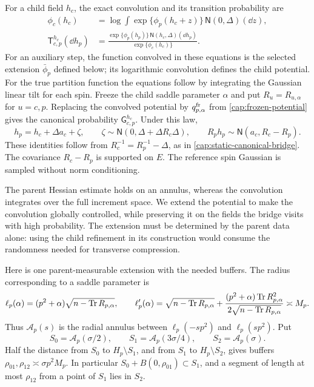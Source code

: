 For a child field \(h_c\), the exact convolution and its transition
probability are
\begin{align}
 \phi_c(h_c)&=\log\int \exp\{\phi_p(h_c+z)\}\,\mathsf N(0,\Delta)(\dd z),
 \label{cap:heat-convolution}\\
 \mathsf T_{c,p}^{h_c}(\dd h_p)
 &=\frac{\exp\{\phi_p(h_p)\}\,
       \mathsf N(h_c,\Delta)(\dd h_p)}{\exp\{\phi_c(h_c)\}}.
 \label{cap:actual-transition}
\end{align}
For an auxiliary step, the function convolved in these equations is the
selected extension \(\bar\phi_p\) defined below; its logarithmic convolution
defines the child potential. For the true partition function the equations
follow by integrating the Gaussian linear tilt for each spin. Freeze the child
saddle parameter \(\alpha\) and put \(R_u=R_{u,\alpha}\) for \(u=c,p\).
Replacing the convolved potential by \(q_{p,\alpha}^{\rm fr}\) from
\eqref{cap:frozen-potential} gives the canonical probability
\(\mathsf G_{c,p}^{h_c}\). Under this law,
\begin{equation}\label{cap:canonical-bridge}
 h_p=h_c+\Delta a_c+\zeta,\qquad
 \zeta\sim\mathsf N(0,\Delta+\Delta R_c\Delta),\qquad
 R_p h_p\sim\mathsf N(a_c,R_c-R_p).
\end{equation}
These identities follow from \(R_c^{-1}=R_p^{-1}-\Delta\), as in
\eqref{cap:static-canonical-bridge}. The covariance \(R_c-R_p\) is supported
on \(E\). The reference spin Gaussian is sampled without norm conditioning.

The parent Hessian estimate holds on an annulus, whereas the convolution
integrates over the full increment space. We extend the potential to make the
convolution globally controlled, while preserving it on the fields the bridge
visits with high probability. The extension must be determined by the parent
data alone: using the child refinement in its construction would consume the
randomness needed for transverse compression.

Here is one parent-measurable extension with the needed buffers. The radius
corresponding to a saddle parameter is
\[
 \ell_p(\alpha)=(p^2+\alpha)\sqrt{n-\operatorname{Tr} R_{p,\alpha}},\qquad
 \ell_p'(\alpha)=\sqrt{n-\operatorname{Tr} R_{p,\alpha}}+
 \frac{(p^2+\alpha)\operatorname{Tr} R_{p,\alpha}^2}
      {2\sqrt{n-\operatorname{Tr} R_{p,\alpha}}}\asymp M_p .
\]
Thus \(\mathcal A_p(s)\) is the radial annulus between
\(\ell_p(-sp^2)\) and \(\ell_p(sp^2)\). Put
\[
 S_0=\mathcal A_p(\sigma/2),\qquad
 S_1=\mathcal A_p(3\sigma/4),\qquad
 S_2=\mathcal A_p(\sigma).
\]
Half the distance from \(S_0\) to \(H_p\setminus S_1\), and from \(S_1\)
to \(H_p\setminus S_2\), gives buffers \(\rho_{01},\rho_{12}\asymp
\sigma p^2M_p\). In particular \(S_0+B(0,\rho_{01})\subset S_1\),
and a segment of length at most \(\rho_{12}\) from a point of \(S_1\)
lies in \(S_2\).

